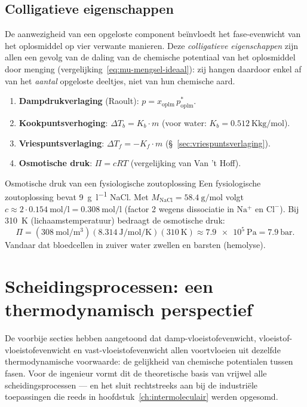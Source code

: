\subsection{Colligatieve eigenschappen}
\label{sec:colligatief}

De aanwezigheid van een opgeloste component be\"invloedt het fase-evenwicht van het oplosmiddel op vier verwante manieren. Deze \emph{colligatieve eigenschappen} zijn allen een gevolg van de daling van de chemische potentiaal van het oplosmiddel door menging (vergelijking~\eqref{eq:mu-mengsel-ideaal}): zij hangen daardoor enkel af van het \emph{aantal} opgeloste deeltjes, niet van hun chemische aard.

\begin{enumerate}
\item \textbf{Dampdrukverlaging} (Raoult): $p = x_{\text{oplm}}\,p^*_{\text{oplm}}$.
\item \textbf{Kookpuntsverhoging}: $\Delta T_b = K_b \cdot m$ (voor water: $K_b = \SI{0.512}{\kelvin\kilogram\per\mole}$).
\item \textbf{Vriespuntsverlaging}: $\Delta T_f = -K_f \cdot m$ (\S~\ref{sec:vriespuntsverlaging}).
\item \textbf{Osmotische druk}: $\Pi = c R T$ (vergelijking van Van 't Hoff).
\end{enumerate}

\begin{voorbeeld}{Osmotische druk van een fysiologische zoutoplossing}
Een fysiologische zoutoplossing bevat \SI{9}{\gram\per\litre} NaCl. Met $M_{\mathrm{NaCl}} = \SI{58.4}{\gram\per\mole}$ volgt $c \approx 2 \cdot \SI{0.154}{\mole\per\litre} = \SI{0.308}{\mole\per\litre}$ (factor 2 wegens dissociatie in $\mathrm{Na^+}$ en $\mathrm{Cl^-}$). Bij \SI{310}{\kelvin} (lichaamstemperatuur) bedraagt de osmotische druk:
\[
\Pi = (\SI{308}{\mole\per\metre\cubed})(\SI{8.314}{\joule\per\mole\per\kelvin})(\SI{310}{\kelvin}) \approx \SI{7.9e5}{\pascal} = \SI{7.9}{\bar}.
\]
Vandaar dat bloedcellen in zuiver water zwellen en barsten (hemolyse).
\end{voorbeeld}

\section{Scheidingsprocessen: een thermodynamisch perspectief}
\label{sec:scheidingsprocessen}

De voorbije secties hebben aangetoond dat damp-vloeistofevenwicht, vloeistof-vloeistofevenwicht en vast-vloeistofevenwicht allen voortvloeien uit dezelfde thermodynamische voorwaarde: de gelijkheid van chemische potentialen tussen fasen. Voor de ingenieur vormt dit de theoretische basis van vrijwel alle scheidingsprocessen --- en het sluit rechtstreeks aan bij de industri\"ele toepassingen die reeds in hoofdstuk~\ref{ch:intermoleculair} werden opgesomd.


